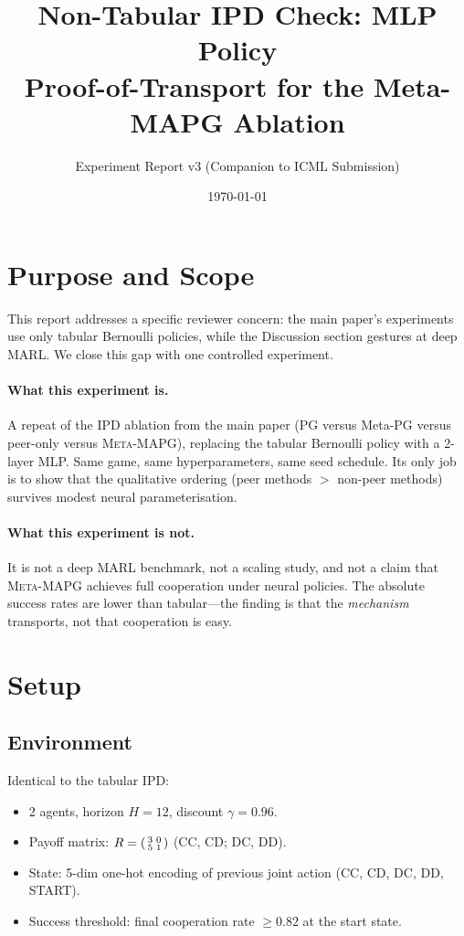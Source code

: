 \documentclass[11pt,a4paper]{article}
\title{%
  \textbf{Non-Tabular IPD Check: MLP Policy}\\[4pt]
  \large Proof-of-Transport for the Meta-MAPG Ablation
}
\author{Experiment Report v3 \quad \small (Companion to ICML Submission)}
\date{\today}
\newcommand{\MAPG}{\textsc{Meta-MAPG}}
\begin{document}
\maketitle

\section{Purpose and Scope}

This report addresses a specific reviewer concern: the main paper's experiments use only tabular Bernoulli policies, while the Discussion section gestures at deep MARL. We close this gap with one controlled experiment.

\paragraph{What this experiment is.}
A repeat of the IPD ablation from the main paper (PG versus Meta-PG versus peer-only versus \MAPG{}), replacing the tabular Bernoulli policy with a 2-layer MLP. Same game, same hyperparameters, same seed schedule. Its only job is to show that the qualitative ordering (peer methods $>$ non-peer methods) survives modest neural parameterisation.

\paragraph{What this experiment is not.}
It is not a deep MARL benchmark, not a scaling study, and not a claim that \MAPG{} achieves full cooperation under neural policies. The absolute success rates are lower than tabular---the finding is that the \emph{mechanism} transports, not that cooperation is easy.

\section{Setup}

\subsection{Environment}

Identical to the tabular IPD:
\begin{itemize}[nosep]
  \item 2 agents, horizon $H=12$, discount $\gamma=0.96$.
  \item Payoff matrix: $R = \begin{psmallmatrix} 3 & 0 \\ 5 & 1 \end{psmallmatrix}$ (CC, CD; DC, DD).
  \item State: 5-dim one-hot encoding of previous joint action (CC, CD, DC, DD, START).
  \item Success threshold: final cooperation rate $\ge 0.82$ at the start state.
\end{itemize}
\end{document}
